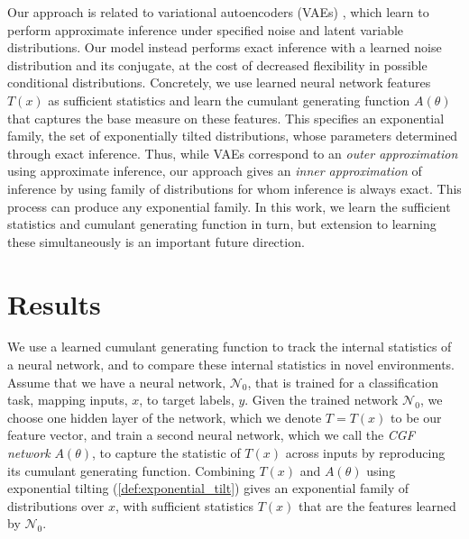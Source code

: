 \documentclass[11pt]{article}      %
\begin{document}
Our approach is related to variational autoencoders (VAEs) \cite{kingma_auto-encoding_2013}, which learn to perform approximate inference under specified noise and latent variable distributions. 
Our model instead performs exact inference with a learned noise distribution and its conjugate, at the cost of decreased flexibility in possible conditional distributions.
Concretely, we use learned neural network features $T(x)$ as sufficient statistics and learn the cumulant generating function $A(\theta)$ that captures the base measure on these features.
This specifies an exponential family, the set of exponentially tilted distributions, whose parameters determined through exact inference.
Thus, while VAEs correspond to an \textit{outer approximation} using approximate inference, our approach gives an \textit{inner approximation} of inference by using family of distributions for whom inference is always exact.
This process can produce any exponential family.
In this work, we learn the sufficient statistics and cumulant generating function in turn, but extension to learning these simultaneously is an important future direction.





\section{Results}

We use a learned cumulant generating function to track the internal statistics of a neural network, and to compare these internal statistics in novel environments.
Assume that we have a neural network, $\mathcal{N}_0$, that is trained for a classification task, mapping inputs, $x$, to target labels, $y$.
Given the trained network $\mathcal{N}_0$, we choose one hidden layer of the network, which we denote $T=T(x)$ to be our feature vector, and train a second neural network, which we call the \textit{CGF network} $A(\theta)$, to capture the statistic of $T(x)$ across inputs by reproducing its cumulant generating function. 
Combining $T(x)$ and $A(\theta)$ using exponential tilting (\ref{def:exponential_tilt}) gives an exponential family of distributions over $x$, with sufficient statistics $T(x)$ that are the features learned by $\mathcal{N}_0$.
\end{document}
